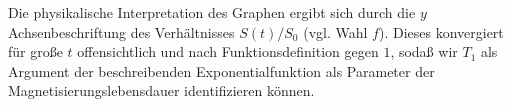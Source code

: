 \documentclass[../../main.tex]{subfiles}
\begin{document}
    Die physikalische Interpretation des Graphen ergibt sich durch die $y$ Achsenbeschriftung des Verhältnisses $S(t)/S_0$ (vgl. Wahl $f$). Dieses konvergiert für große $t$ offensichtlich und nach Funktionsdefinition gegen $1$, sodaß wir $T_1$ als Argument der beschreibenden Exponentialfunktion als Parameter der Magnetisierungslebensdauer identifizieren können. 
\end{document}
